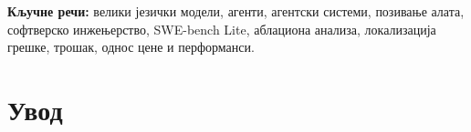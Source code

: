 \documentclass[12pt,a4paper]{report}
\begin{document}
	\textbf{Кључне речи:} велики језички модели, агенти, агентски системи, позивање алата, софтверско инжењерство, SWE-bench Lite, аблациона анализа, локализација грешке, трошак, однос цене и перформанси.
	
	\newpage
	\thispagestyle{empty}
	\tableofcontents
	
	
	\restoregeometry
	\pagestyle{radstil}
	\setcounter{page}{1}
	
	\vspace*{-20.7bp}
	\chapter{Увод}
	
\end{document}
